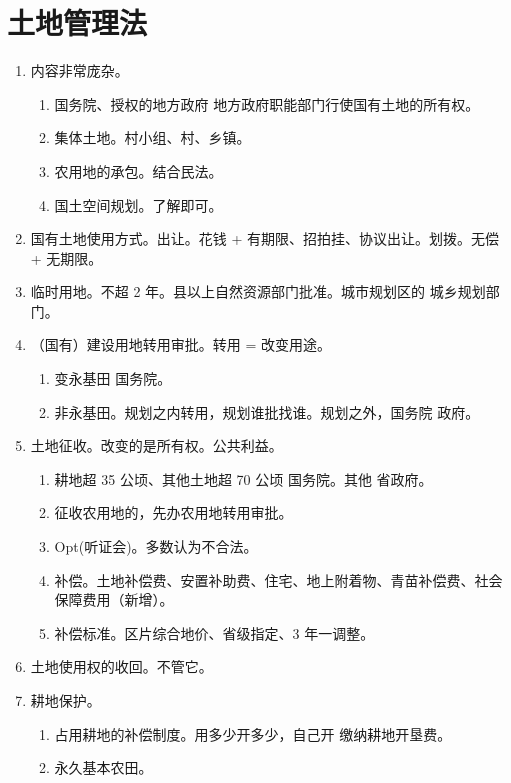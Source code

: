 \section{土地管理法}
\begin{enumerate}
  \item 内容非常庞杂。
        \begin{enumerate}
          \item 国务院、授权的地方政府 \hz 地方政府职能部门行使国有土地的所有权。
          \item 集体土地。村小组、村、乡镇。
          \item 农用地的承包。结合民法。
          \item 国土空间规划。了解即可。
        \end{enumerate}
  \item 国有土地使用方式。\yi 出让。花钱 + 有期限、招拍挂、协议出让。\er 划拨。无偿 + 无期限。
  \item 临时用地。不超 2 年。县以上自然资源部门批准。城市规划区的 \yjt 城乡规划部门。
  \item （国有）建设用地转用审批。转用 = 改变用途。
        \begin{enumerate}
          \item 变永基田 \yjt 国务院。
          \item 非永基田。\yi 规划之内转用，规划谁批找谁。\er 规划之外，国务院 \hz 政府。
        \end{enumerate}
  \item 土地征收。改变的是所有权。公共利益。
        \begin{enumerate}
          \item 耕地超 35 公顷、其他土地超 70 公顷 \yjt 国务院。其他 \yjt 省政府。
          \item 征收农用地的，先办农用地转用审批。
          \item Opt(听证会)。多数认为不合法。
          \item 补偿。土地补偿费、安置补助费、住宅、地上附着物、青苗补偿费、社会保障费用（新增）。
          \item 补偿标准。区片综合地价、省级指定、3 年一调整。
        \end{enumerate}
  \item 土地使用权的收回。不管它。
  \item 耕地保护。
        \begin{enumerate}
          \item 占用耕地的补偿制度。用多少开多少，自己开 \hz 缴纳耕地开垦费。
          \item 永久基本农田。

\end{enumerate}
\end{enumerate}
